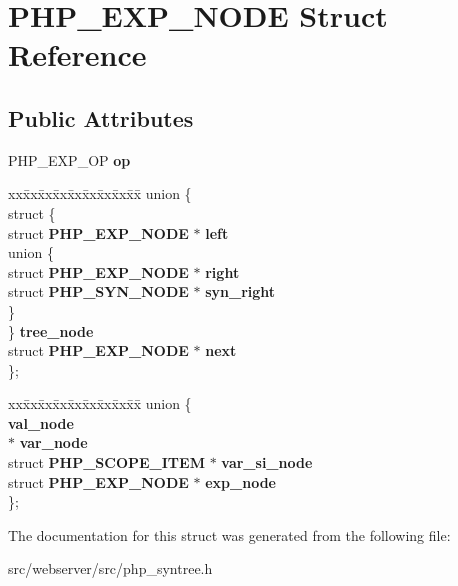 \section{PHP\_\-EXP\_\-NODE Struct Reference}
\label{structPHP__EXP__NODE}
\subsection*{Public Attributes}
\begin{DoxyCompactItemize}
\item 
PHP\_\-EXP\_\-OP {\bfseries op}\label{structPHP__EXP__NODE_a8293a8013fbc08428ea4e6aeecef1b7b}

\item 
\begin{tabbing}
xx\=xx\=xx\=xx\=xx\=xx\=xx\=xx\=xx\=\kill
union \{\\
\>struct \{\\
\>\>struct {\bf PHP\_EXP\_NODE} $\ast$ {\bfseries left}\\
\>\>union \{\\
\>\>\>struct {\bf PHP\_EXP\_NODE} $\ast$ {\bfseries right}\\
\>\>\>struct {\bf PHP\_SYN\_NODE} $\ast$ {\bfseries syn\_right}\\
\>\>\} \label{structPHP__EXP__NODE_1_1@23_1_1@27_aab633366c1bbe50c0d53b1b44a9c9413}
\\
\>\} {\bfseries tree\_node}\\
\>struct {\bf PHP\_EXP\_NODE} $\ast$ {\bfseries next}\\
\}; \label{structPHP__EXP__NODE_aa90ade6ad6a74a805593a6557ea04dbe}
\\

\end{tabbing}\item 
\begin{tabbing}
xx\=xx\=xx\=xx\=xx\=xx\=xx\=xx\=xx\=\kill
union \{\\
 {\bfseries val\_node}\\
 $\ast$ {\bfseries var\_node}\\
\>struct {\bf PHP\_SCOPE\_ITEM} $\ast$ {\bfseries var\_si\_node}\\
\>struct {\bf PHP\_EXP\_NODE} $\ast$ {\bfseries exp\_node}\\
\}; \label{structPHP__EXP__NODE_a9aabb4470dc425da9a99d991b462b63b}
\\

\end{tabbing}\end{DoxyCompactItemize}


The documentation for this struct was generated from the following file:\begin{DoxyCompactItemize}
\item 
src/webserver/src/php\_\-syntree.h\end{DoxyCompactItemize}
